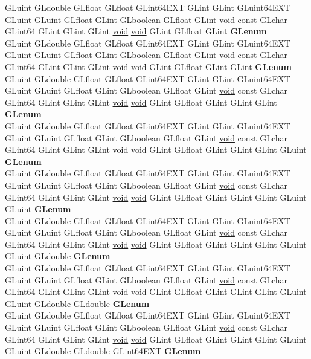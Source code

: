 \begin{DoxyCompactItemize}
\begin{tabbing}
\>GLuint GLdouble GLfloat GLfloat GLint64EXT GLint GLint GLuint64EXT GLuint GLuint GLfloat GLint GLboolean GLfloat GLint \hyperlink{interfacevoid}{void} const GLchar GLint64 GLint GLint GLint \hyperlink{interfacevoid}{void} \hyperlink{interfacevoid}{void} GLint GLfloat GLint {\bfseries GLenum}\\
\>GLuint GLdouble GLfloat GLfloat GLint64EXT GLint GLint GLuint64EXT GLuint GLuint GLfloat GLint GLboolean GLfloat GLint \hyperlink{interfacevoid}{void} const GLchar GLint64 GLint GLint GLint \hyperlink{interfacevoid}{void} \hyperlink{interfacevoid}{void} GLint GLfloat GLint GLint {\bfseries GLenum}\\
\>GLuint GLdouble GLfloat GLfloat GLint64EXT GLint GLint GLuint64EXT GLuint GLuint GLfloat GLint GLboolean GLfloat GLint \hyperlink{interfacevoid}{void} const GLchar GLint64 GLint GLint GLint \hyperlink{interfacevoid}{void} \hyperlink{interfacevoid}{void} GLint GLfloat GLint GLint GLint {\bfseries GLenum}\\
\>GLuint GLdouble GLfloat GLfloat GLint64EXT GLint GLint GLuint64EXT GLuint GLuint GLfloat GLint GLboolean GLfloat GLint \hyperlink{interfacevoid}{void} const GLchar GLint64 GLint GLint GLint \hyperlink{interfacevoid}{void} \hyperlink{interfacevoid}{void} GLint GLfloat GLint GLint GLint GLuint {\bfseries GLenum}\\
\>GLuint GLdouble GLfloat GLfloat GLint64EXT GLint GLint GLuint64EXT GLuint GLuint GLfloat GLint GLboolean GLfloat GLint \hyperlink{interfacevoid}{void} const GLchar GLint64 GLint GLint GLint \hyperlink{interfacevoid}{void} \hyperlink{interfacevoid}{void} GLint GLfloat GLint GLint GLint GLuint GLuint {\bfseries GLenum}\\
\>GLuint GLdouble GLfloat GLfloat GLint64EXT GLint GLint GLuint64EXT GLuint GLuint GLfloat GLint GLboolean GLfloat GLint \hyperlink{interfacevoid}{void} const GLchar GLint64 GLint GLint GLint \hyperlink{interfacevoid}{void} \hyperlink{interfacevoid}{void} GLint GLfloat GLint GLint GLint GLuint GLuint GLdouble {\bfseries GLenum}\\
\>GLuint GLdouble GLfloat GLfloat GLint64EXT GLint GLint GLuint64EXT GLuint GLuint GLfloat GLint GLboolean GLfloat GLint \hyperlink{interfacevoid}{void} const GLchar GLint64 GLint GLint GLint \hyperlink{interfacevoid}{void} \hyperlink{interfacevoid}{void} GLint GLfloat GLint GLint GLint GLuint GLuint GLdouble GLdouble {\bfseries GLenum}\\
\>GLuint GLdouble GLfloat GLfloat GLint64EXT GLint GLint GLuint64EXT GLuint GLuint GLfloat GLint GLboolean GLfloat GLint \hyperlink{interfacevoid}{void} const GLchar GLint64 GLint GLint GLint \hyperlink{interfacevoid}{void} \hyperlink{interfacevoid}{void} GLint GLfloat GLint GLint GLint GLuint GLuint GLdouble GLdouble GLint64EXT {\bfseries GLenum}\\

\end{tabbing}
\end{DoxyCompactItemize}
